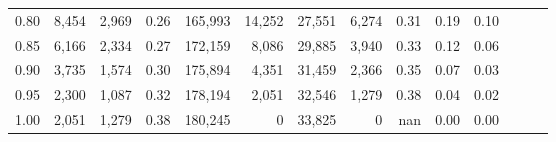 \begin{tabular}{rrrrrrrrrrrrrr}
0.80 &   8,454 &  2,969 &  0.26 &  165,993 &   14,252 &  27,551 &   6,274 &  0.31 &  0.19 &      0.10 \\
0.85 &   6,166 &  2,334 &  0.27 &  172,159 &    8,086 &  29,885 &   3,940 &  0.33 &  0.12 &      0.06 \\
0.90 &   3,735 &  1,574 &  0.30 &  175,894 &    4,351 &  31,459 &   2,366 &  0.35 &  0.07 &      0.03 \\
0.95 &   2,300 &  1,087 &  0.32 &  178,194 &    2,051 &  32,546 &   1,279 &  0.38 &  0.04 &      0.02 \\
1.00 &   2,051 &  1,279 &  0.38 &  180,245 &        0 &  33,825 &       0 &   nan &  0.00 &      0.00 \\
\bottomrule
\end{tabular}
